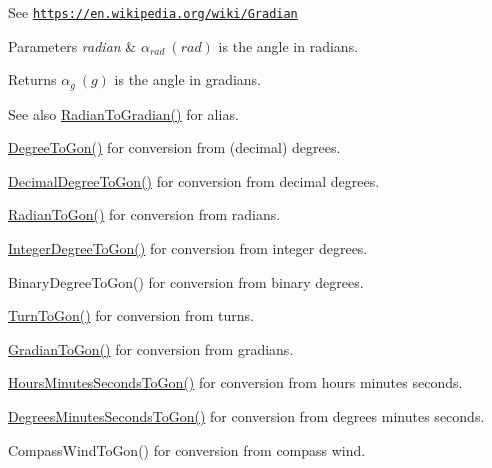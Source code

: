 See \href{https://en.wikipedia.org/wiki/Gradian}{\tt https\+://en.\+wikipedia.\+org/wiki/\+Gradian} 
\begin{DoxyParams}{Parameters}
{\em radian} & $\alpha_{rad}\ (rad)$ is the angle in radians. \\
\hline
\end{DoxyParams}
\begin{DoxyReturn}{Returns}
$\alpha_{g}\ (g)$ is the angle in gradians. 
\end{DoxyReturn}
\begin{DoxySeeAlso}{See also}
\mbox{\hyperlink{group___e_g_x_math-_angle_conversions-_radian_ga3c1607eae50cbf0186c42485bb3878d5}{Radian\+To\+Gradian()}} for alias. 

\mbox{\hyperlink{group___e_g_x_math-_angle_conversions-_degree_ga87c3fab0867021e5d2501197b4db6194}{Degree\+To\+Gon()}} for conversion from (decimal) degrees. 

\mbox{\hyperlink{group___e_g_x_math-_angle_conversions-_decimal_degree_gaeb333a1ad0aeb913c025fbd1be85fcb3}{Decimal\+Degree\+To\+Gon()}} for conversion from decimal degrees. 

\mbox{\hyperlink{group___e_g_x_math-_angle_conversions-_radian_ga36912e5a810b64c271c4dafc17f4ca45}{Radian\+To\+Gon()}} for conversion from radians. 

\mbox{\hyperlink{group___e_g_x_math-_angle_conversions-_integer_degree_ga6e5be425c37ad27319f09329156c64bb}{Integer\+Degree\+To\+Gon()}} for conversion from integer degrees. 

Binary\+Degree\+To\+Gon() for conversion from binary degrees. 

\mbox{\hyperlink{group___e_g_x_math-_angle_conversions-_turn_gad81dd0bb1660ef24e28fa15b2403dec7}{Turn\+To\+Gon()}} for conversion from turns. 

\mbox{\hyperlink{group___e_g_x_math-_angle_conversions-_gradian_gaff399262b6c8455e450e0a9dc8eb2ad1}{Gradian\+To\+Gon()}} for conversion from gradians. 

\mbox{\hyperlink{group___e_g_x_math-_angle_conversions-_hours_minutes_seconds_ga356f1e89c3ea35a9d46967644d4ddfd3}{Hours\+Minutes\+Seconds\+To\+Gon()}} for conversion from hours minutes seconds. 

\mbox{\hyperlink{group___e_g_x_math-_angle_conversions-_degrees_minutes_seconds_ga90b481c224ad083726ffe0fd35f4dbfc}{Degrees\+Minutes\+Seconds\+To\+Gon()}} for conversion from degrees minutes seconds. 

Compass\+Wind\+To\+Gon() for conversion from compass wind. 
\end{DoxySeeAlso}
\mbox{\label{group___e_g_x_math-_angle_conversions-_radian_ga3c1607eae50cbf0186c42485bb3878d5}} 
